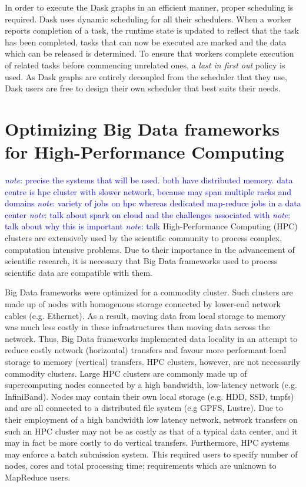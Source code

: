 \documentclass{report}
\newcommand{\note}[1]{\textcolor{blue}{\textit{note}: #1}}
\begin{document}
            In order to execute the Dask graphs in an efficient manner, proper 
            scheduling is required. Dask uses dynamic scheduling for all their 
            schedulers. When a worker reports completion of a task, the runtime 
            state is updated to reflect that the task has been completed, tasks 
            that can now be executed are marked and the data which can be 
            released is determined. To ensure that workers complete execution of
            related tasks before commencing unrelated ones, a 
            \textit{last in first out} policy is used. As Dask graphs are 
            entirely decoupled from the scheduler that they use, Dask users are 
            free to design their own scheduler that best suits their needs.


\chapter{Optimizing Big Data frameworks for High-Performance Computing}
	
    \note{precise the systems that will be used. both have distributed memory.
    data centre is hpc cluster with slower network, because may span multiple
    racks and domains} \note{variety of jobs on hpc whereas dedicated map-reduce
    jobs in a data center} \note{talk about spark on cloud and the challenges
    associated with} \note{talk about why this is important} \note{talk }
    High-Performance Computing (HPC) clusters are extensively used by the
    scientific community to process complex, computation intensive problems. Due
    to their importance in the advancement of scientific research, it is
    necessary that Big Data frameworks used to process scientific data are
    compatible with them. 
	
    Big Data frameworks were optimized for a commodity cluster.  Such clusters
    are made up of nodes with homogenous storage connected by lower-end network
    cables (e.g. Ethernet). As a result, moving data from local storage to
    memory was much less costly in these infrastructures than moving data across
    the network. Thus, Big Data frameworks implemented data locality in an
    attempt to reduce costly network (horizontal) transfers and favour more
    performant local storage to memory (vertical) transfers. HPC clusters,
    however, are not necessarily commodity clusters. Large HPC clusters are
    commonly made up of supercomputing nodes connected by a high bandwidth,
    low-latency network (e.g.  InfiniBand). Nodes may contain their own local
    storage (e.g. HDD, SSD, tmpfs) and are all connected to a distributed file
    system (e.g GPFS, Lustre).  Due to their employment of a high bandwidth low
    latency network, network transfers on such an HPC cluster may not be as
    costly as that of a typical data center, and it may in fact be more costly
    to do vertical transfers. Furthermore, HPC systems may enforce a batch
    submission system. This required users to specify number of nodes, cores and
    total processing time; requirements which are unknown to MapReduce users.
	
\end{document}
